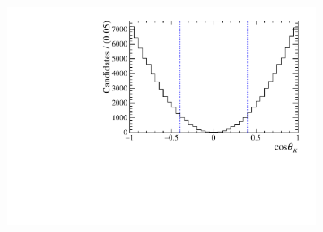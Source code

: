 \begin{figure}[!ht]
\begin{subfigure}[t]{0.32\textwidth}
        \centering 
        \includegraphics[width=1.0\textwidth]{figs/B2DsPhi/phi_Helicity.pdf}
    \end{subfigure}\\


\end{figure}
